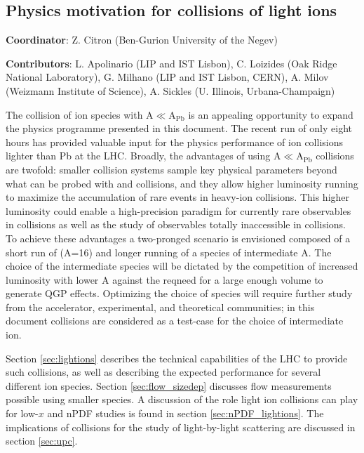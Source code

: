 \subsection{Physics motivation for collisions of light ions}
\label{sec:smallAsum}
{ \small
\noindent \textbf{Coordinator}: Z. Citron (Ben-Gurion University of the Negev)

\noindent \textbf{Contributors}:
L. Apolinario (LIP and IST Lisbon),
C. Loizides (Oak Ridge National Laboratory),
G. Milhano (LIP and IST Lisbon, CERN),
A. Milov (Weizmann Institute of Science),
A. Sickles (U. Illinois, Urbana-Champaign)
}


The collision of ion species with A$\ll$A$_\mathrm{Pb}$ is an appealing opportunity to expand the physics programme presented in this document.  The recent \XeXe run of only eight hours has provided valuable input for the physics performance of ion collisions lighter than Pb at the LHC.  Broadly, the advantages of using A$\ll$A$_\mathrm{Pb}$  collisions are twofold: smaller collision systems sample key physical parameters beyond what can be probed with \PbPb and \pPb collisions, and they allow higher luminosity running to maximize the accumulation of rare events in heavy-ion collisions.  This higher luminosity could enable a high-precision paradigm for currently rare observables in \PbPb collisions as well as the study of observables totally inaccessible in \PbPb collisions.        
To achieve these advantages a two-pronged scenario is envisioned composed of a short run of \OO  (A=16) and longer running of a species of intermediate A.  The choice of the intermediate species will be dictated by the competition of increased luminosity with lower A against the reqneed for a large enough volume to generate QGP effects.  Optimizing the choice of species will require further study from the accelerator, experimental, and theoretical communities; in this document \ArAr collisions are considered as a test-case for the choice of intermediate ion.

Section \ref{sec:lightions} describes the technical capabilities of the LHC to provide such collisions, as well as describing the expected performance for several different ion species.  Section \ref{sec:flow_sizedep} discusses flow measurements possible using smaller species.  A discussion of the role light ion collisions can play for low-$x$ and nPDF studies is found in section \ref{sec:nPDF_lightions}.  The implications of \ArAr collisions for the study of light-by-light scattering are discussed in section \ref{sec:upc}. 

